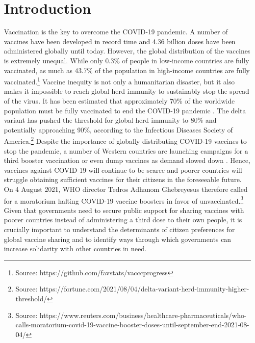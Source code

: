 \documentclass[12pt,oneside,smallheadings,chapterprefix=true]{article}
\begin{document}
\thispagestyle{empty}

\newpage
\doublespacing

\setcounter{page}{1}

\section*{Introduction}
Vaccination is the key to overcome the COVID-19 pandemic. A number of vaccines have been developed in record time and 4.36 billion doses have been administered globally  until today. However, the global distribution of the vaccines is extremely unequal. While only 0.3\% of people in low-income countries are fully vaccinated, as much as 43.7\% of the population in high-income countries are fully vaccinated.\footnote{Source: https://github.com/favstats/vacccprogress} Vaccine inequity is not only a humanitarian disaster, but it also makes it impossible to reach global herd immunity to sustainably stop the spread of the virus. It has been estimated that  approximately 70\% of the worldwide population must be fully vaccinated to end the COVID-19 pandemic \citep{Randolph2020}. The delta variant has pushed the threshold for global herd immunity to  80\% and potentially approaching 90\%, according to the Infectious Diseases Society of America.\footnote{Source:  https://fortune.com/2021/08/04/delta-variant-herd-immunity-higher-threshold/} Despite the importance of globally distributing COVID-19 vaccines to stop the pandemic, a number of Western countries are launching campaigns for a third booster vaccination or even dump vaccines as demand slowed down \citep{Mahase2021}. Hence,  vaccines against COVID-19 will continue to be scarce  and poorer countries will struggle obtaining  sufficient vaccines for their citizens in the foreseeable future. On 4 August 2021, WHO director Tedros Adhanom Ghebreyesus therefore called for a moratorium halting COVID-19 vaccine boosters in favor of unvaccinated.\footnote{Source: https://www.reuters.com/business/healthcare-pharmaceuticals/who-calls-moratorium-covid-19-vaccine-booster-doses-until-september-end-2021-08-04/} Given that governments need to secure public support for sharing vaccines with poorer countries instead of administering a third dose to their own people, it is crucially important to understand the determinants of citizen preferences for global vaccine sharing and to identify ways through which governments can increase solidarity with other countries in need. 
\end{document}
